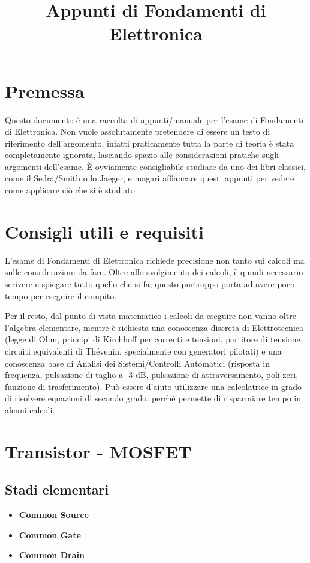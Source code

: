 \documentclass[a4paper,twocolumn,notitlepage]{book}
\begin{document}
	\onecolumn
	\title{Appunti di Fondamenti di Elettronica}
	\maketitle	
	\section*{Premessa}
	Questo documento è una raccolta di appunti/manuale per l'esame di Fondamenti di Elettronica. Non vuole assolutamente pretendere di essere un testo di riferimento dell'argomento, infatti praticamente tutta la parte di teoria è stata completamente ignorata, lasciando spazio alle considerazioni pratiche sugli argomenti dell'esame. È ovviamente consigliabile studiare da uno dei libri classici, come il Sedra/Smith o lo Jaeger, e magari affiancare questi appunti per vedere come applicare ciò che si è studiato. 
	
	\section*{Consigli utili e requisiti}
	L'esame di Fondamenti di Elettronica richiede precisione non tanto sui calcoli ma sulle considerazioni da fare.
	Oltre allo svolgimento dei calcoli, è quindi necessario scrivere e spiegare tutto quello che si fa; questo purtroppo porta ad avere poco tempo per eseguire il compito.

	Per il resto, dal punto di vista matematico i calcoli da eseguire non vanno oltre l'algebra elementare, 
	mentre è richiesta una conoscenza discreta di Elettrotecnica (legge di Ohm, principi di Kirchhoff per correnti e tensioni, partitore di tensione, circuiti equivalenti di Thévenin, specialmente con generatori pilotati) e una conoscenza base di Analisi dei Sistemi/Controlli Automatici (risposta in frequenza, pulsazione di taglio a -3 dB, pulsazione di attraversamento, poli-zeri, funzione di trasferimento). Può essere d'aiuto utilizzare una calcolatrice in grado di risolvere equazioni di secondo grado, perché permette di risparmiare tempo in alcuni calcoli.
	\newpage
	\twocolumn
	
	\section*{Transistor - MOSFET}
		\subsection*{Stadi elementari}	
			\begin{itemize}
				\item \textbf{Common Source}
				\item \textbf{Common Gate}
				\item \textbf{Common Drain}
	
			\end{itemize}
\end{document}
